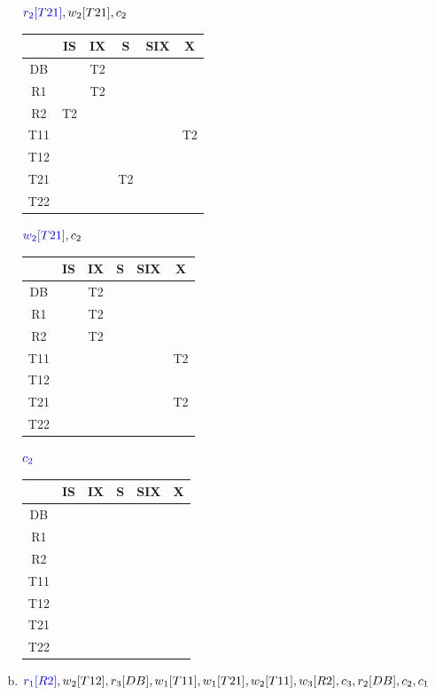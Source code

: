 \begin{note}
\begin{enumerate}[a)]
$\textcolor{blue}{r_2[T21]}, w_2[T21], c_2$

\begin{tabular}{|c|c|c|c|c|c|}
	\hline
	& IS & IX & S & SIX & X \\
	\hline
	DB &  & T2 &  &  &  \\
	\hline
	R1 &  & T2 &  &  &  \\
	\hline
	R2 & T2 &  &  &  &  \\
	\hline
	T11 &  &  &  &  & T2 \\
	\hline
	T12 &  &  &  &  &  \\
	\hline
	T21 &  &  & T2 &  &  \\
	\hline
	T22 &  &  &  &  &  \\
	\hline
\end{tabular}

$\textcolor{blue}{w_2[T21]}, c_2$

\begin{tabular}{|c|c|c|c|c|c|}
	\hline
	& IS & IX & S & SIX & X \\
	\hline
	DB &  & T2 &  &  &  \\
	\hline
	R1 &  & T2 &  &  &  \\
	\hline
	R2 &  & T2 &  &  &  \\
	\hline
	T11 &  &  &  &  & T2 \\
	\hline
	T12 &  &  &  &  &  \\
	\hline
	T21 &  &  &  &  & T2 \\
	\hline
	T22 &  &  &  &  &  \\
	\hline
\end{tabular}

$\textcolor{blue}{c_2}$

\begin{tabular}{|c|c|c|c|c|c|}
	\hline
	& IS & IX & S & SIX & X \\
	\hline
	DB &  &  &  &  &  \\
	\hline
	R1 &  &  &  &  &  \\
	\hline
	R2 &  &  &  &  &  \\
	\hline
	T11 &  &  &  &  &  \\
	\hline
	T12 &  &  &  &  &  \\
	\hline
	T21 &  &  &  &  &  \\
	\hline
	T22 &  &  &  &  &  \\
	\hline
\end{tabular}

\item $\textcolor{blue}{r_1[R2]}, w_2[T12], r_3[DB], w_1[T11], w_1[T21], w_2[T11], w_3[R2], c_3, r_2[DB], c_2, c_1$


\end{enumerate}
\end{note}
